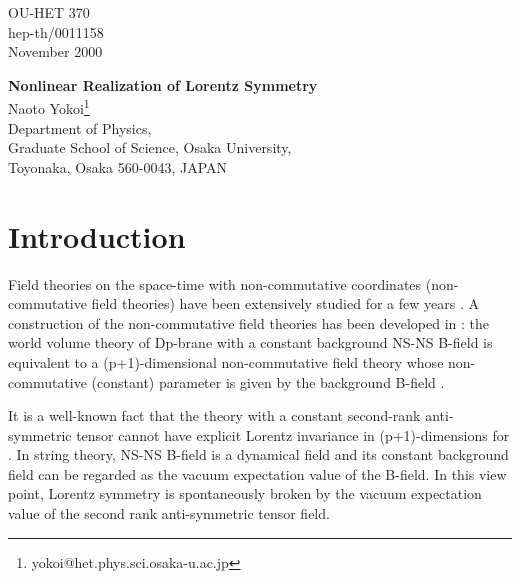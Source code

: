 \documentclass[a4paper,12pt]{article}
\begin{document}
\begin{flushright}
OU-HET 370\\
hep-th/0011158\\
November 2000
\end{flushright}
\vspace*{1.5cm}
\begin{center}
{\Large {\bf Nonlinear Realization of Lorentz Symmetry}} \\
\bigskip
Naoto Yokoi\footnote{yokoi@het.phys.sci.osaka-u.ac.jp}\\
\bigskip
{\small
Department of Physics,\\
Graduate School of Science, Osaka University,\\
Toyonaka, Osaka 560-0043, JAPAN
}
\end{center}
\bigskip
\bigskip
\bigskip

\begin{abstract}
We explore a nonlinear realization of the (2+1)-dimensional 
Lorentz symmetry with a constant vacuum expectation value
of the second rank anti-symmetric tensor field. 
By means of the nonlinear realization, 
we obtain the low-energy effective action of the Nambu-Goldstone
bosons for the spontaneous Lorentz symmetry breaking. 
\end{abstract}

\newpage

\section{Introduction}
Field theories on the space-time with non-commutative coordinates
(non-commutative field theories) have been extensively studied 
for a few years \cite{Connes, IKKT, Seiberg-Witten}. 
A construction of the non-commutative field theories  
has been developed in \cite{Seiberg-Witten}: 
the world volume theory of Dp-brane with
a constant background NS-NS B-field is equivalent to a (p+1)-dimensional
non-commutative field theory whose non-commutative (constant) parameter
\coordHE{} is given by the background B-field \coordHE{}.

It is a well-known fact that the theory with a constant second-rank
anti-symmetric tensor cannot have explicit Lorentz invariance
in (p+1)-dimensions for \coordHE{}.
In string theory, NS-NS B-field is a dynamical 
field and its constant background field
can be regarded as the vacuum expectation value of the B-field.
In this view point, Lorentz symmetry is spontaneously broken
by the vacuum expectation value of the second rank anti-symmetric
tensor field.
\end{document}
